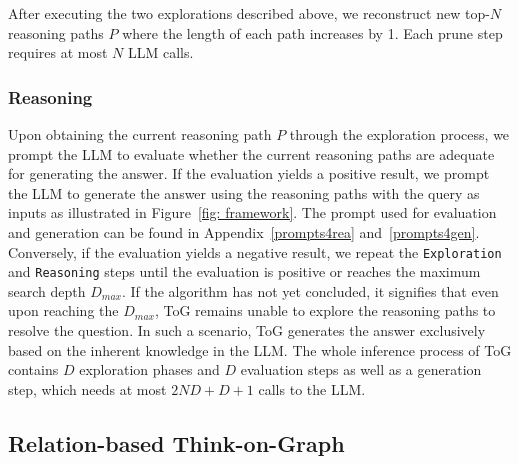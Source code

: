 \documentclass{article} %
\begin{document}
After executing the two explorations described above, we reconstruct new top-$N$ reasoning paths $P$ where the length of each path increases by 1. Each prune step requires at most $N$ LLM calls.
\subsubsection{Reasoning}
\label{sec: reasoning}
Upon obtaining the current reasoning path $P$ through the exploration process, we prompt the LLM to evaluate whether the current reasoning paths are adequate for generating the answer. If the evaluation yields a positive result, we prompt the LLM to generate the answer using the reasoning paths with the query as inputs as illustrated in Figure~\ref{fig: framework}. The prompt used for evaluation and generation can be found in Appendix~\ref{prompts4rea} and~\ref{prompts4gen}. Conversely, if the evaluation yields a negative result, we repeat the \texttt{Exploration} and \texttt{Reasoning} steps until the evaluation is positive or reaches the maximum search depth $D_{max}$. If the algorithm has not yet concluded, it signifies that even upon reaching the $D_{max}$, ToG remains unable to explore the reasoning paths to resolve the question. In such a scenario, ToG generates the answer exclusively based on the inherent knowledge in the LLM.
The whole inference process of ToG contains $D$ exploration phases and $D$ evaluation steps as well as a generation step, which needs at most $2ND+D+1$ calls to the LLM. 


\subsection{Relation-based Think-on-Graph}
\end{document}
